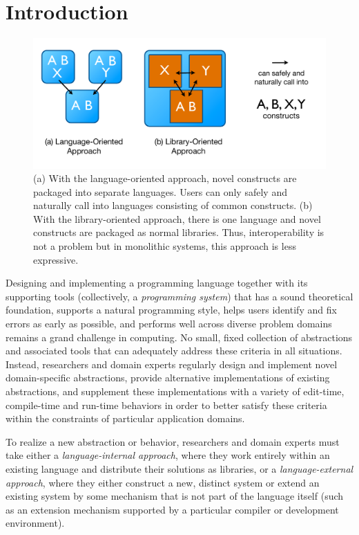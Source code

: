 \section{Introduction}\begin{figure}
\begin{center}
\includegraphics[scale=0.5]{approaches.pdf}
\end{center}
\vspace{-20px}
\caption{\small (a) With the language-oriented approach, novel constructs are packaged into separate languages. Users can only safely and naturally call into languages consisting of common constructs. (b) With the library-oriented approach, there is one language and novel constructs are packaged as normal libraries. Thus, interoperability is not a problem but in monolithic systems, this approach is less expressive.\label{approaches}}
\end{figure}
Designing and implementing a programming language together with its supporting tools (collectively, a \emph{programming system}) that has a sound theoretical foundation, supports a natural programming style, helps users identify and fix errors as early as possible, and performs well across diverse problem domains remains a grand challenge in computing. No small, fixed collection of abstractions and associated tools that can adequately address these criteria in all situations. Instead,  researchers and domain experts regularly design and implement novel domain-specific abstractions, provide alternative implementations of existing abstractions, and supplement these implementations with a variety of edit-time, compile-time and run-time behaviors in order to better satisfy these criteria within the constraints of particular application domains.

To realize a new abstraction or behavior, researchers and domain experts must take either a \emph{language-internal approach}, where they work entirely within an existing language and distribute their solutions as libraries, or a \emph{language-external approach}, where they either construct a new, distinct system or extend an existing system by some mechanism that is not part of the language itself (such as an extension mechanism supported by a particular compiler or development environment).


